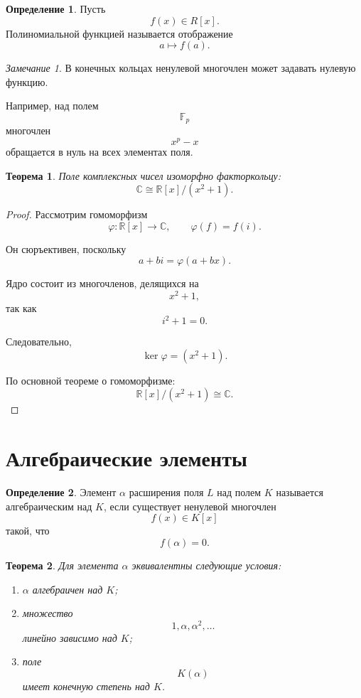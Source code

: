 \documentclass[12pt, a4paper]{article}
\newtheorem{theorem}{Теорема}
\theoremstyle{definition}
\newtheorem{definition}{Определение}
\theoremstyle{remark}
\newtheorem*{remark}{Замечание}
\begin{document}
\begin{definition}
	Пусть
	\[
	f(x)\in R[x].
	\]
	Полиномиальной функцией называется отображение
	\[
	a\mapsto f(a).
	\]
\end{definition}

\begin{remark}
	В конечных кольцах ненулевой многочлен может задавать нулевую функцию.
	
	Например, над полем
	\[
	\mathbb{F}_p
	\]
	многочлен
	\[
	x^p-x
	\]
	обращается в нуль на всех элементах поля.
\end{remark}

\begin{theorem}
	Поле комплексных чисел изоморфно факторкольцу:
	\[
	\mathbb{C}\cong \mathbb{R}[x]/(x^2+1).
	\]
\end{theorem}

\begin{proof}
	Рассмотрим гомоморфизм
	\[
	\varphi:\mathbb{R}[x]\to\mathbb{C},
	\qquad
	\varphi(f)=f(i).
	\]
	
	Он сюръективен, поскольку
	\[
	a+bi=\varphi(a+bx).
	\]
	
	Ядро состоит из многочленов, делящихся на
	\[
	x^2+1,
	\]
	так как
	\[
	i^2+1=0.
	\]
	
	Следовательно,
	\[
	\ker\varphi=(x^2+1).
	\]
	
	По основной теореме о гомоморфизме:
	\[
	\mathbb{R}[x]/(x^2+1)\cong\mathbb{C}.
	\]
\end{proof}

\section{Алгебраические элементы}

\begin{definition}
	Элемент $\alpha$ расширения поля $L$ над полем $K$ называется алгебраическим над $K$, если существует ненулевой многочлен
	\[
	f(x)\in K[x]
	\]
	такой, что
	\[
	f(\alpha)=0.
	\]
\end{definition}

\begin{theorem}
	Для элемента $\alpha$ эквивалентны следующие условия:
	\begin{enumerate}
		\item $\alpha$ алгебраичен над $K$;
		\item множество
		\[
		1,\alpha,\alpha^2,\dots
		\]
		линейно зависимо над $K$;
		\item поле
		\[
		K(\alpha)
		\]
		имеет конечную степень над $K$.
	\end{enumerate}
\end{theorem}
\end{document}
